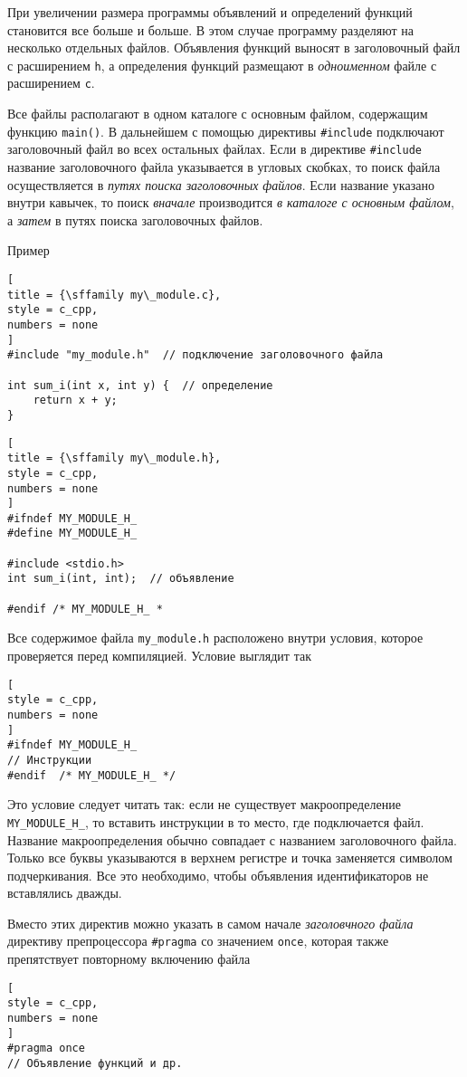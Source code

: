 \documentclass[%
	11pt,
	a4paper,
	utf8,
		]{article}
\begin{document}
При увеличении размера программы объявлений и определений функций становится все больше и больше. В этом случае программу разделяют на несколько отдельных файлов. Объявления функций выносят в заголовочный файл с расширением \verb|h|, а определения функций размещают в \emph{одноименном} файле с расширением \verb|c|. 

Все файлы располагают в одном каталоге с основным файлом, содержащим функцию \verb|main()|. В дальнейшем с помощью директивы \verb|#include| подключают заголовочный файл во всех остальных файлах. Если в директиве \verb|#include| название заголовочного файла указывается в угловых скобках, то поиск файла осуществляется в \emph{путях поиска заголовочных файлов}. Если название указано внутри кавычек, то поиск \emph{вначале} производится \emph{в каталоге с основным файлом}, а \emph{затем} в путях поиска заголовочных файлов.

Пример
\begin{lstlisting}[
title = {\sffamily my\_module.c},
style = c_cpp,
numbers = none
]
#include "my_module.h"  // подключение заголовочного файла

int sum_i(int x, int y) {  // определение
    return x + y;
}
\end{lstlisting}

\begin{lstlisting}[
title = {\sffamily my\_module.h},
style = c_cpp,
numbers = none
]
#ifndef MY_MODULE_H_
#define MY_MODULE_H_

#include <stdio.h>
int sum_i(int, int);  // объявление

#endif /* MY_MODULE_H_ *
\end{lstlisting}

Все содержимое файла \verb|my_module.h| расположено внутри условия, которое проверяется перед компиляцией. Условие выглядит так
\begin{lstlisting}[
style = c_cpp,
numbers = none
]
#ifndef MY_MODULE_H_
// Инструкции
#endif  /* MY_MODULE_H_ */
\end{lstlisting}

Это условие следует читать так: если не существует макроопределение \verb|MY_MODULE_H_|, то вставить инструкции в то место, где подключается файл. Название макроопределения обычно совпадает с названием заголовочного файла. Только все буквы указываются в верхнем регистре и точка заменяется символом подчеркивания. Все это необходимо, чтобы объявления идентификаторов не вставлялись дважды.

Вместо этих директив можно указать в самом начале \emph{заголовчного файла} директиву препроцессора \verb|#pragma| со значением \verb|once|, которая также препятствует повторному включению файла
\begin{lstlisting}[
style = c_cpp,
numbers = none
]
#pragma once
// Объявление функций и др.
\end{lstlisting}
\end{document}
